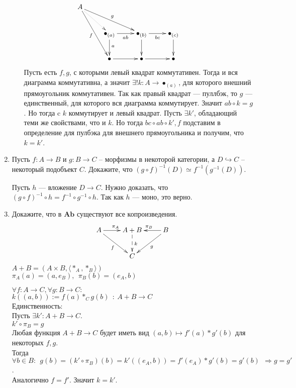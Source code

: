 \documentclass[draft]{article}
\newcommand{\cat}[1]{\mathbf{#1}}
\newcommand{\Ab}{\cat{Ab}}
\begin{document}
\begin{enumerate}
\begin{itemize}
\[ \xymatrix{ 
A \ar@{..>}[dr] \ar[ddr]_f \ar[rrd]^g & & & &\\
& \bullet_{(a)} \ar[r]_{ab} \ar[d]^a & \bullet_{(b)} \ar[r]_{bc} \ar[d] & \bullet_{(c)} \ar[d]\\
& \bullet \ar[r]      & \bullet \ar[r]        & \bullet
} \]
Пусть есть $f, g$, с которыми левый квадрат коммутативен. Тогда и вся диаграмма коммутативна, а значит $\exists!k : A \to \bullet_{(a)}$, для которого внешний прямоугольник коммутативен. Так как правый квадрат --- пуллбэк, то $g$ --- единственный, для которого вся диаграмма коммутирует. Значит $ab \circ k = g$. Но тогда c $k$ коммутирует и левый квадрат. Пусть  $\exists k'$, обладающий теми же свойствами, что и $k$. Но тогда $bc\circ ab \circ k', f$ подставим в определение для пулбэка для внешнего прямоугольника и получим, что $k = k'$.


\end{itemize}

\item Пусть $f : A \to B$ и $g : B \to C$ -- морфизмы в некоторой категории, а $D \hookrightarrow C$ -- некоторый подобъект $C$.
Докажите, что $(g \circ f)^{-1}(D) \simeq f^{-1}(g^{-1}(D))$.

Пусть $h$ --- вложение $D\to C$. Нужно доказать, что $(g \circ f)^{-1} \circ h = f^{-1} \circ g^{-1} \circ h$. Так как $h$ --- моно, это верно.

\item Докажите, что в $\Ab$ существуют все копроизведения.\\

\[ \xymatrix{ 
A\ar[r]^{\pi_A} \ar[dr]_{f} & A+B \ar@{-->}[d]^k & B \ar[l]_{\pi_B} \ar[ld]^{g}\\
 & C&
} \]
$A+B = (A\times B, \langle \ast_A, \ast_B\rangle)$\\
$\pi_A(a) = (a, e_B),~~\pi_B(b) = (e_A, b)$

$\forall f : A \to C, \forall g : B \to C:$\\
$k((a, b)) := f(a)\ast_C g(b) ~~:~A+B \to C$\\

Единственность:\\
Пусть $\exists k': A+B\to C$.\\
$k' \circ \pi_B = g$\\
Любая функция $A+B\to C$ будет иметь вид $(a, b)\mapsto f'(a)\ast g'(b)$ для некоторых $f, g$. \\
Тогда $\forall b \in B:~~ g(b) = (k' \circ \pi_B)(b) = k'((e_A, b)) = f'(e_A)\ast g'(b) = g'(b)~~\Rightarrow g = g'$.\\
Аналогично $f = f'$. Значит $k=k'$.


\end{enumerate}
\end{document}
